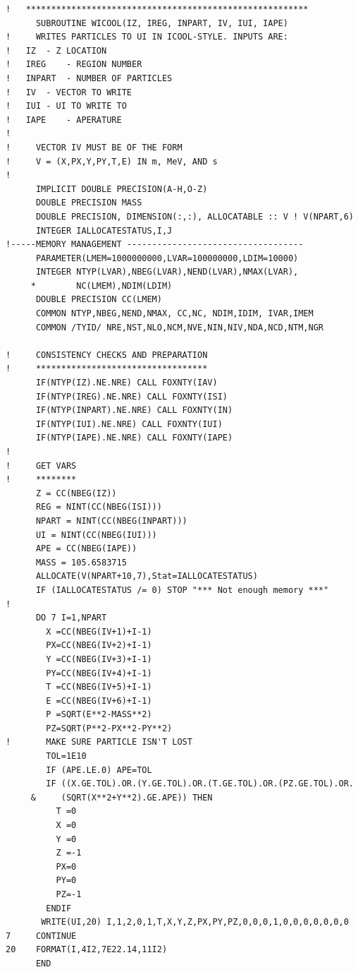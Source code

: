 \begin{lstlisting}
!   ********************************************************
      SUBROUTINE WICOOL(IZ, IREG, INPART, IV, IUI, IAPE)
!     WRITES PARTICLES TO UI IN ICOOL-STYLE. INPUTS ARE:
!   IZ  - Z LOCATION
!   IREG    - REGION NUMBER
!   INPART  - NUMBER OF PARTICLES
!   IV  - VECTOR TO WRITE
!   IUI - UI TO WRITE TO
!   IAPE    - APERATURE
!
!     VECTOR IV MUST BE OF THE FORM
!     V = (X,PX,Y,PY,T,E) IN m, MeV, AND s
!
      IMPLICIT DOUBLE PRECISION(A-H,O-Z)
      DOUBLE PRECISION MASS
      DOUBLE PRECISION, DIMENSION(:,:), ALLOCATABLE :: V ! V(NPART,6)
      INTEGER IALLOCATESTATUS,I,J
!-----MEMORY MANAGEMENT -----------------------------------
      PARAMETER(LMEM=1000000000,LVAR=100000000,LDIM=10000)
      INTEGER NTYP(LVAR),NBEG(LVAR),NEND(LVAR),NMAX(LVAR),
     *        NC(LMEM),NDIM(LDIM)
      DOUBLE PRECISION CC(LMEM)
      COMMON NTYP,NBEG,NEND,NMAX, CC,NC, NDIM,IDIM, IVAR,IMEM
      COMMON /TYID/ NRE,NST,NLO,NCM,NVE,NIN,NIV,NDA,NCD,NTM,NGR

!     CONSISTENCY CHECKS AND PREPARATION
!     **********************************
      IF(NTYP(IZ).NE.NRE) CALL FOXNTY(IAV)
      IF(NTYP(IREG).NE.NRE) CALL FOXNTY(ISI)
      IF(NTYP(INPART).NE.NRE) CALL FOXNTY(IN)
      IF(NTYP(IUI).NE.NRE) CALL FOXNTY(IUI)
      IF(NTYP(IAPE).NE.NRE) CALL FOXNTY(IAPE)
!
!     GET VARS
!     ********
      Z = CC(NBEG(IZ))
      REG = NINT(CC(NBEG(ISI)))
      NPART = NINT(CC(NBEG(INPART)))
      UI = NINT(CC(NBEG(IUI)))
      APE = CC(NBEG(IAPE))
      MASS = 105.6583715
      ALLOCATE(V(NPART+10,7),Stat=IALLOCATESTATUS)
      IF (IALLOCATESTATUS /= 0) STOP "*** Not enough memory ***"
!
      DO 7 I=1,NPART
        X =CC(NBEG(IV+1)+I-1)
        PX=CC(NBEG(IV+2)+I-1)
        Y =CC(NBEG(IV+3)+I-1)
        PY=CC(NBEG(IV+4)+I-1)
        T =CC(NBEG(IV+5)+I-1)
        E =CC(NBEG(IV+6)+I-1)
        P =SQRT(E**2-MASS**2)
        PZ=SQRT(P**2-PX**2-PY**2)
!       MAKE SURE PARTICLE ISN'T LOST
        TOL=1E10
        IF (APE.LE.0) APE=TOL
        IF ((X.GE.TOL).OR.(Y.GE.TOL).OR.(T.GE.TOL).OR.(PZ.GE.TOL).OR.
     &     (SQRT(X**2+Y**2).GE.APE)) THEN
          T =0
          X =0
          Y =0
          Z =-1
          PX=0
          PY=0
          PZ=-1
        ENDIF
       WRITE(UI,20) I,1,2,0,1,T,X,Y,Z,PX,PY,PZ,0,0,0,1,0,0,0,0,0,0,0
7     CONTINUE
20    FORMAT(I,4I2,7E22.14,11I2)
      END

\end{lstlisting}